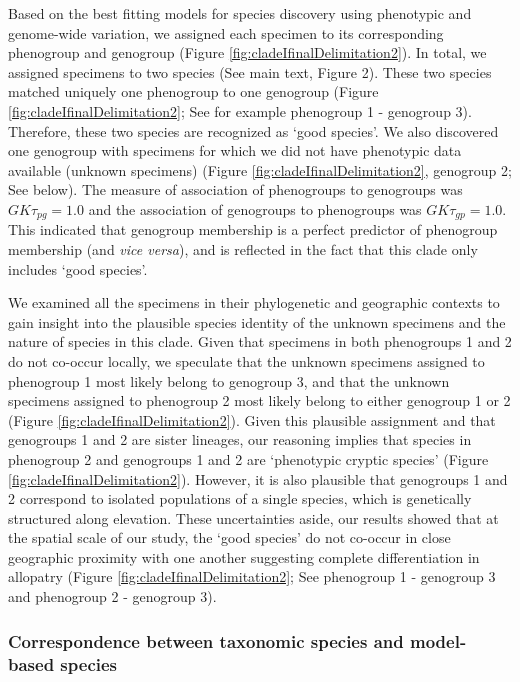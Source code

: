 \documentclass[
  11pt,
]{article}
\begin{document}
Based on the best fitting models for species discovery using phenotypic and genome-wide variation, we assigned each specimen to its corresponding phenogroup and genogroup (Figure \ref{fig:cladeIfinalDelimitation2}). In total, we assigned specimens to two species (See main text, Figure 2). These two species matched uniquely one phenogroup to one genogroup (Figure \ref{fig:cladeIfinalDelimitation2}; See for example phenogroup 1 - genogroup 3). Therefore, these two species are recognized as `good species'. We also discovered one genogroup with specimens for which we did not have phenotypic data available (unknown specimens) (Figure \ref{fig:cladeIfinalDelimitation2}, genogroup 2; See below). The measure of association of phenogroups to genogroups was \(GK\tau_{pg}=1.0\) and the association of genogroups to phenogroups was \(GK\tau_{gp}=1.0\). This indicated that genogroup membership is a perfect predictor of phenogroup membership (and \emph{vice versa}), and is reflected in the fact that this clade only includes `good species'.

We examined all the specimens in their phylogenetic and geographic contexts to gain insight into the plausible species identity of the unknown specimens and the nature of species in this clade. Given that specimens in both phenogroups 1 and 2 do not co-occur locally, we speculate that the unknown specimens assigned to phenogroup 1 most likely belong to genogroup 3, and that the unknown specimens assigned to phenogroup 2 most likely belong to either genogroup 1 or 2 (Figure \ref{fig:cladeIfinalDelimitation2}). Given this plausible assignment and that genogroups 1 and 2 are sister lineages, our reasoning implies that species in phenogroup 2 and genogroups 1 and 2 are `phenotypic cryptic species' (Figure \ref{fig:cladeIfinalDelimitation2}). However, it is also plausible that genogroups 1 and 2 correspond to isolated populations of a single species, which is genetically structured along elevation. These uncertainties aside, our results showed that at the spatial scale of our study, the `good species' do not co-occur in close geographic proximity with one another suggesting complete differentiation in allopatry (Figure \ref{fig:cladeIfinalDelimitation2}; See phenogroup 1 - genogroup 3 and phenogroup 2 - genogroup 3).

\hypertarget{correspondence-between-taxonomic-species-and-model-based-species}{%
\subsubsection{Correspondence between taxonomic species and model-based species}\label{correspondence-between-taxonomic-species-and-model-based-species}}
\end{document}
